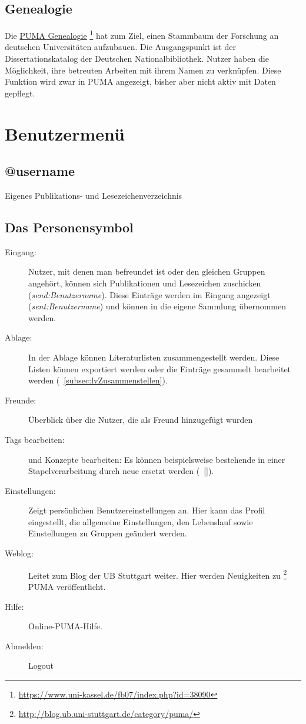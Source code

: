 \subsection{Genealogie}
\label{subsec:genealogie}
Die \href{https://www.uni-kassel.de/fb07/index.php?id=38090}{PUMA Genealogie} \footnote{\url{https://www.uni-kassel.de/fb07/index.php?id=38090}} hat zum Ziel, einen Stammbaum der Forschung an deutschen Universitäten aufzubauen. Die Ausgangspunkt ist der Dissertationskatalog der Deutschen Nationalbibliothek. Nutzer haben die Möglichkeit, ihre betreuten Arbeiten mit ihrem Namen zu verknüpfen. Diese Funktion wird zwar in PUMA angezeigt, bisher aber nicht aktiv mit Daten gepflegt.

\section{Benutzermenü}
\label{sec:benutzermenue}
\subsection{@username}
\label{subsec:username}
Eigenes Publikations- und Lesezeichenverzeichnis
\subsection{Das Personensymbol}
\label{subsec:Personensymbol}
\begin{description}
\item[Eingang:] Nutzer, mit denen man befreundet ist oder den gleichen Gruppen angehört, können sich Publikationen und Lesezeichen zuschicken (\tag \textit{send:Benutzername}). Diese Einträge werden im Eingang angezeigt (\tag \textit{sent:Benutzername}) und können in die eigene Sammlung übernommen werden.
\item [Ablage:] In der Ablage können Literaturlisten zusammengestellt werden. Diese Listen können exportiert werden oder die Einträge gesammelt bearbeitet werden (~\autoref{subsec:lvZusammenstellen}). 
\item [Freunde:] Überblick über die Nutzer, die als Freund hinzugefügt wurden 
\item [Tags bearbeiten:] \tags und Konzepte bearbeiten: Es können beispielsweise bestehende \tags in einer Stapelverarbeitung durch neue ersetzt werden (~\autoref{}).
\item [Einstellungen:] Zeigt persönlichen Benutzereinstellungen an. Hier kann das Profil eingestellt, die allgemeine Einstellungen, den Lebenslauf sowie Einstellungen zu Gruppen geändert werden.
\item [Weblog:] Leitet zum Blog der UB Stuttgart weiter. Hier werden Neuigkeiten zu \footnote{\url{http://blog.ub.uni-stuttgart.de/category/puma/}} PUMA veröffentlicht.
\item [Hilfe:] Online-PUMA-Hilfe.
\item [Abmelden:] Logout 
\end{description}

